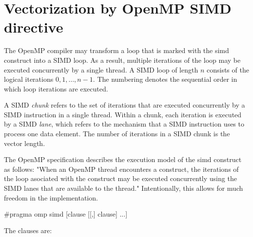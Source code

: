 
\section{Vectorization by OpenMP SIMD directive}

The OpenMP compiler may transform a loop that is marked with the simd construct into a SIMD loop. As a result, multiple iterations of the loop may be executed concurrently by a single thread. A SIMD loop of length $n$ consists of the logical iterations $0,1,\dots,n-1$. The numbering denotes the sequential order in which loop iterations are executed. 

A SIMD \textit{chunk} refers to the set of iterations that are executed concurrently by a SIMD instruction in a single thread. Within a chunk, each iteration is executed by a SIMD \textit{lane}, which refers to the mechanism that a SIMD instruction uses to process one data element. The number of iterations in a SIMD chunk is the vector length. 

The OpenMP specification describes the execution model of the simd construct as follows: "When an OpenMP thread encounters a  construct, the iterations of the loop asociated with the construct may be executed concurrently using the SIMD lanes that are available to the thread." Intentionally, this allows for much freedom in the implementation. 

\begin{codeblock}[language=C]
#pragma omp simd [clause [[,] clause] ...]
\end{codeblock}

The clauses are:

